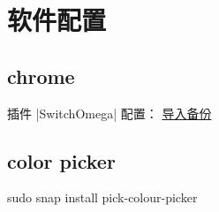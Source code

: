 \section{软件配置}

\subsection{chrome}
插件 |SwitchOmega| 配置：
\href{https://raw.githubusercontent.com/Shadowsocks-Help/Shadowsocks/master/Download/OmegaOptions-1080.bak}
{导入备份}

\subsection{color picker}
\begin{mysh}
sudo snap install pick-colour-picker
\end{mysh}
